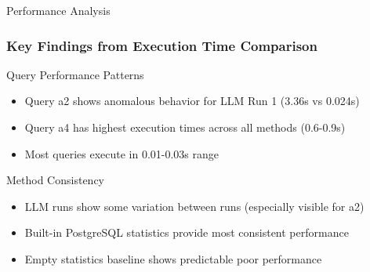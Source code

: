 \documentclass[smaller]{beamer}
\begin{document}
\begin{frame}{Performance Analysis}
\frametitle{Key Findings from Execution Time Comparison}

\begin{block}{Query Performance Patterns}
\begin{itemize}
    \item Query a2 shows anomalous behavior for LLM Run 1 (3.36s vs 0.024s)
    \item Query a4 has highest execution times across all methods (0.6-0.9s)
    \item Most queries execute in 0.01-0.03s range
\end{itemize}
\end{block}

\begin{block}{Method Consistency}
\begin{itemize}
    \item LLM runs show some variation between runs (especially visible for a2)
    \item Built-in PostgreSQL statistics provide most consistent performance
    \item Empty statistics baseline shows predictable poor performance
\end{itemize}
\end{block}

\end{frame}
\end{document}
